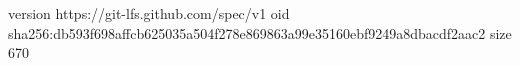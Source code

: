 version https://git-lfs.github.com/spec/v1
oid sha256:db593f698affcb625035a504f278e869863a99e35160ebf9249a8dbacdf2aac2
size 670
